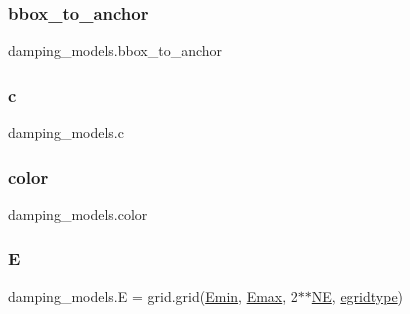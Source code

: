 \subsubsection{\texorpdfstring{bbox\+\_\+to\+\_\+anchor}{bbox\_to\_anchor}}
{\footnotesize\ttfamily damping\+\_\+models.\+bbox\+\_\+to\+\_\+anchor}

\mbox{\label{namespacedamping__models_a7ae8a7481c2889a47f4d376eef5ae4f6}} 
\subsubsection{\texorpdfstring{c}{c}}
{\footnotesize\ttfamily damping\+\_\+models.\+c}

\mbox{\label{namespacedamping__models_ada15223206a55c619904d093f03faec2}} 
\subsubsection{\texorpdfstring{color}{color}}
{\footnotesize\ttfamily damping\+\_\+models.\+color}

\mbox{\label{namespacedamping__models_a2d49832acd95610ad1ef20d532cda813}} 
\subsubsection{\texorpdfstring{E}{E}}
{\footnotesize\ttfamily damping\+\_\+models.\+E = grid.\+grid(\hyperlink{namespacedamping__models_acef10a0ab3ea64edbebc04afc529f201}{Emin}, \hyperlink{namespacedamping__models_a97002a3ccce4531cb0913dad401bb7c8}{Emax}, 2$\ast$$\ast$\hyperlink{namespacedamping__models_a70f7b31459ca4b1018560e17b17b9864}{NE}, \hyperlink{namespacedamping__models_a4a43583393950d4ac546b8812693c4bc}{egridtype})}

\mbox{\label{namespacedamping__models_a4a43583393950d4ac546b8812693c4bc}} 
